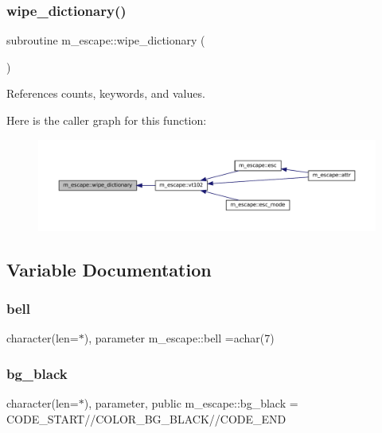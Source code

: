 \subsubsection{\texorpdfstring{wipe\+\_\+dictionary()}{wipe\_dictionary()}}
{\footnotesize\ttfamily subroutine m\+\_\+escape\+::wipe\+\_\+dictionary (\begin{DoxyParamCaption}{ }\end{DoxyParamCaption})\hspace{0.3cm}{\ttfamily [private]}}



References counts, keywords, and values.

Here is the caller graph for this function\+:\nopagebreak
\begin{figure}[H]
\begin{center}
\leavevmode
\includegraphics[width=350pt]{namespacem__escape_a1bc574bc97157fe67d868d2bd180c91e_icgraph}
\end{center}
\end{figure}


\subsection{Variable Documentation}
\mbox{\label{namespacem__escape_a2cd9c30d3783af9d1f74a50e7f1dbd7f}} 
\subsubsection{\texorpdfstring{bell}{bell}}
{\footnotesize\ttfamily character(len=$\ast$), parameter m\+\_\+escape\+::bell =achar(7)\hspace{0.3cm}{\ttfamily [private]}}

\mbox{\label{namespacem__escape_a2f34e53ba01ebac10ab70f25e3c9727a}} 
\subsubsection{\texorpdfstring{bg\+\_\+black}{bg\_black}}
{\footnotesize\ttfamily character(len=$\ast$), parameter, public m\+\_\+escape\+::bg\+\_\+black = C\+O\+D\+E\+\_\+\+S\+T\+A\+RT//C\+O\+L\+O\+R\+\_\+\+B\+G\+\_\+\+B\+L\+A\+CK//C\+O\+D\+E\+\_\+\+E\+ND}


